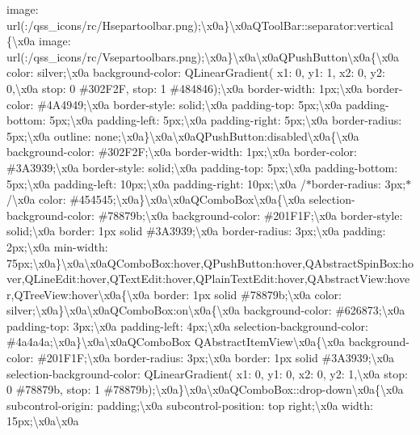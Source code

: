 \begin{DoxyCompactItemize}
image\+: url(\+:/qss\+\_\+icons/rc/\+Hsepartoolbar.\+png);\textbackslash{}x0a\}\textbackslash{}x0a\+Q\+Tool\+Bar\+::separator\+:vertical \{\textbackslash{}x0a image\+: url(\+:/qss\+\_\+icons/rc/\+Vsepartoolbars.\+png);\textbackslash{}x0a\}\textbackslash{}x0a\textbackslash{}x0a\+Q\+Push\+Button\textbackslash{}x0a\{\textbackslash{}x0a color\+: silver;\textbackslash{}x0a background-\/color\+: Q\+Linear\+Gradient( x1\+: 0, y1\+: 1, x2\+: 0, y2\+: 0,\textbackslash{}x0a stop\+: 0 \#302\+F2\+F, stop\+: 1 \#484846);\textbackslash{}x0a border-\/width\+: 1px;\textbackslash{}x0a border-\/color\+: \#4\+A4949;\textbackslash{}x0a border-\/style\+: solid;\textbackslash{}x0a padding-\/top\+: 5px;\textbackslash{}x0a padding-\/bottom\+: 5px;\textbackslash{}x0a padding-\/left\+: 5px;\textbackslash{}x0a padding-\/right\+: 5px;\textbackslash{}x0a border-\/radius\+: 5px;\textbackslash{}x0a outline\+: none;\textbackslash{}x0a\}\textbackslash{}x0a\textbackslash{}x0a\+Q\+Push\+Button\+:disabled\textbackslash{}x0a\{\textbackslash{}x0a background-\/color\+: \#302\+F2\+F;\textbackslash{}x0a border-\/width\+: 1px;\textbackslash{}x0a border-\/color\+: \#3\+A3939;\textbackslash{}x0a border-\/style\+: solid;\textbackslash{}x0a padding-\/top\+: 5px;\textbackslash{}x0a padding-\/bottom\+: 5px;\textbackslash{}x0a padding-\/left\+: 10px;\textbackslash{}x0a padding-\/right\+: 10px;\textbackslash{}x0a /$\ast$border-\/radius\+: 3px;$\ast$/\textbackslash{}x0a color\+: \#454545;\textbackslash{}x0a\}\textbackslash{}x0a\textbackslash{}x0a\+Q\+Combo\+Box\textbackslash{}x0a\{\textbackslash{}x0a selection-\/background-\/color\+: \#78879b;\textbackslash{}x0a background-\/color\+: \#201\+F1\+F;\textbackslash{}x0a border-\/style\+: solid;\textbackslash{}x0a border\+: 1px solid \#3\+A3939;\textbackslash{}x0a border-\/radius\+: 3px;\textbackslash{}x0a padding\+: 2px;\textbackslash{}x0a min-\/width\+: 75px;\textbackslash{}x0a\}\textbackslash{}x0a\textbackslash{}x0a\+Q\+Combo\+Box\+:hover,\+Q\+Push\+Button\+:hover,\+Q\+Abstract\+Spin\+Box\+:hover,\+Q\+Line\+Edit\+:hover,\+Q\+Text\+Edit\+:hover,\+Q\+Plain\+Text\+Edit\+:hover,\+Q\+Abstract\+View\+:hover,\+Q\+Tree\+View\+:hover\textbackslash{}x0a\{\textbackslash{}x0a border\+: 1px solid \#78879b;\textbackslash{}x0a color\+: silver;\textbackslash{}x0a\}\textbackslash{}x0a\textbackslash{}x0a\+Q\+Combo\+Box\+:on\textbackslash{}x0a\{\textbackslash{}x0a background-\/color\+: \#626873;\textbackslash{}x0a padding-\/top\+: 3px;\textbackslash{}x0a padding-\/left\+: 4px;\textbackslash{}x0a selection-\/background-\/color\+: \#4a4a4a;\textbackslash{}x0a\}\textbackslash{}x0a\textbackslash{}x0a\+Q\+Combo\+Box Q\+Abstract\+Item\+View\textbackslash{}x0a\{\textbackslash{}x0a background-\/color\+: \#201\+F1\+F;\textbackslash{}x0a border-\/radius\+: 3px;\textbackslash{}x0a border\+: 1px solid \#3\+A3939;\textbackslash{}x0a selection-\/background-\/color\+: Q\+Linear\+Gradient( x1\+: 0, y1\+: 0, x2\+: 0, y2\+: 1,\textbackslash{}x0a stop\+: 0 \#78879b, stop\+: 1 \#78879b);\textbackslash{}x0a\}\textbackslash{}x0a\textbackslash{}x0a\+Q\+Combo\+Box\+::drop-\/down\textbackslash{}x0a\{\textbackslash{}x0a subcontrol-\/origin\+: padding;\textbackslash{}x0a subcontrol-\/position\+: top right;\textbackslash{}x0a width\+: 15px;\textbackslash{}x0a\textbackslash{}x0a 
\end{DoxyCompactItemize}
